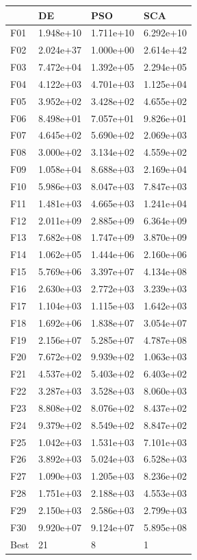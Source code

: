 \begin{tabular}{llll}
\toprule
{} &         DE &        PSO &        SCA \\
\midrule
F01  &  1.948e+10 &  1.711e+10 &  6.292e+10 \\
F02  &  2.024e+37 &  1.000e+00 &  2.614e+42 \\
F03  &  7.472e+04 &  1.392e+05 &  2.294e+05 \\
F04  &  4.122e+03 &  4.701e+03 &  1.125e+04 \\
F05  &  3.952e+02 &  3.428e+02 &  4.655e+02 \\
F06  &  8.498e+01 &  7.057e+01 &  9.826e+01 \\
F07  &  4.645e+02 &  5.690e+02 &  2.069e+03 \\
F08  &  3.000e+02 &  3.134e+02 &  4.559e+02 \\
F09  &  1.058e+04 &  8.688e+03 &  2.169e+04 \\
F10  &  5.986e+03 &  8.047e+03 &  7.847e+03 \\
F11  &  1.481e+03 &  4.665e+03 &  1.241e+04 \\
F12  &  2.011e+09 &  2.885e+09 &  6.364e+09 \\
F13  &  7.682e+08 &  1.747e+09 &  3.870e+09 \\
F14  &  1.062e+05 &  1.444e+06 &  2.160e+06 \\
F15  &  5.769e+06 &  3.397e+07 &  4.134e+08 \\
F16  &  2.630e+03 &  2.772e+03 &  3.239e+03 \\
F17  &  1.104e+03 &  1.115e+03 &  1.642e+03 \\
F18  &  1.692e+06 &  1.838e+07 &  3.054e+07 \\
F19  &  2.156e+07 &  5.285e+07 &  4.787e+08 \\
F20  &  7.672e+02 &  9.939e+02 &  1.063e+03 \\
F21  &  4.537e+02 &  5.403e+02 &  6.403e+02 \\
F22  &  3.287e+03 &  3.528e+03 &  8.060e+03 \\
F23  &  8.808e+02 &  8.076e+02 &  8.437e+02 \\
F24  &  9.379e+02 &  8.549e+02 &  8.847e+02 \\
F25  &  1.042e+03 &  1.531e+03 &  7.101e+03 \\
F26  &  3.892e+03 &  5.024e+03 &  6.528e+03 \\
F27  &  1.090e+03 &  1.205e+03 &  8.236e+02 \\
F28  &  1.751e+03 &  2.188e+03 &  4.553e+03 \\
F29  &  2.150e+03 &  2.586e+03 &  2.799e+03 \\
F30  &  9.920e+07 &  9.124e+07 &  5.895e+08 \\
Best &         21 &          8 &          1 \\
\bottomrule
\end{tabular}
